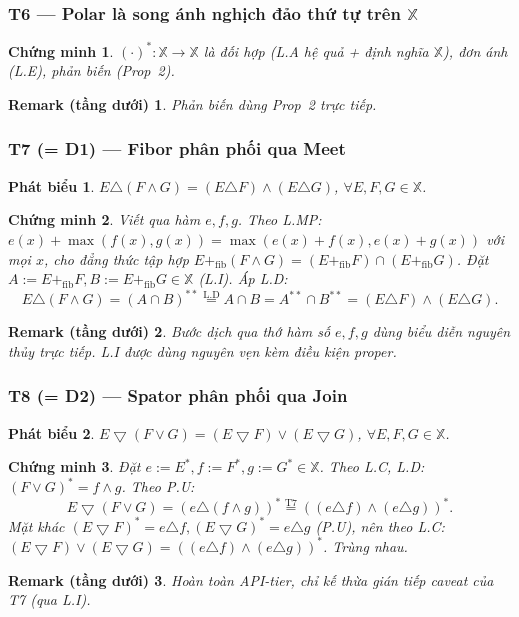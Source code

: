 \documentclass[11pt]{article}
\theoremstyle{plainlabel}
\newtheorem*{phatbieu}{Phát biểu}
\newtheorem*{chungminh}{Chứng minh}
\newtheorem*{remarkbox}{Remark (tầng dưới)}
\begin{document}
\subsubsection*{T6 --- Polar là song ánh nghịch đảo thứ tự trên $\mathbb X$}
\begin{chungminh} $(\cdot)^*:\mathbb X\to\mathbb X$ là đối hợp (L.A hệ quả + định nghĩa $\mathbb X$), đơn ánh (L.E), phản biến (Prop~2). \end{chungminh}
\begin{remarkbox} Phản biến dùng Prop~2 trực tiếp. \end{remarkbox}

\subsubsection*{T7 (= D1) --- Fibor phân phối qua Meet}
\begin{phatbieu} $E\triangle(F\wedge G)=(E\triangle F)\wedge(E\triangle G)$, $\forall E,F,G\in\mathbb X$. \end{phatbieu}
\begin{chungminh}
Viết qua hàm $e,f,g$. Theo L.MP: $e(x)+\max(f(x),g(x))=\max(e(x)+f(x),e(x)+g(x))$ với mọi $x$, cho đẳng thức tập hợp $E+_{\mathrm{fib}}(F\wedge G)=(E+_{\mathrm{fib}}F)\cap(E+_{\mathrm{fib}}G)$. Đặt $A:=E+_{\mathrm{fib}}F,B:=E+_{\mathrm{fib}}G\in\mathbb X$ (L.I). Áp L.D:
\[
E\triangle(F\wedge G)=(A\cap B)^{**}\overset{\text{L.D}}{=}A\cap B=A^{**}\cap B^{**}=(E\triangle F)\wedge(E\triangle G).
\]
\end{chungminh}
\begin{remarkbox} Bước dịch qua thớ hàm số $e,f,g$ dùng biểu diễn nguyên thủy trực tiếp. L.I được dùng nguyên vẹn kèm điều kiện proper. \end{remarkbox}

\subsubsection*{T8 (= D2) --- Spator phân phối qua Join}
\begin{phatbieu} $E\bigtriangledown(F\vee G)=(E\bigtriangledown F)\vee(E\bigtriangledown G)$, $\forall E,F,G\in\mathbb X$. \end{phatbieu}
\begin{chungminh}
Đặt $e:=E^*,f:=F^*,g:=G^*\in\mathbb X$. Theo L.C, L.D: $(F\vee G)^*=f\wedge g$. Theo P.U:
\[
E\bigtriangledown(F\vee G)=(e\triangle(f\wedge g))^*\overset{\text{T7}}{=}((e\triangle f)\wedge(e\triangle g))^*.
\]
Mặt khác $(E\bigtriangledown F)^*=e\triangle f,(E\bigtriangledown G)^*=e\triangle g$ (P.U), nên theo L.C: $(E\bigtriangledown F)\vee(E\bigtriangledown G)=((e\triangle f)\wedge(e\triangle g))^*$. Trùng nhau.
\end{chungminh}
\begin{remarkbox} Hoàn toàn API-tier, chỉ kế thừa gián tiếp caveat của T7 (qua L.I). \end{remarkbox}
\end{document}
